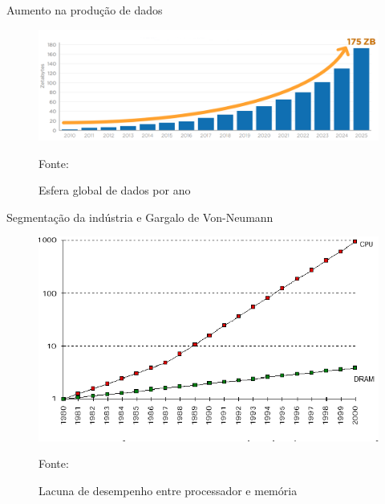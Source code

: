 \begin{frame}{Aumento na produção de dados}
	\begin{figure}[h!]
        \centering
        \includegraphics[width=\columnwidth]{images/relatorio-idc.png}
        
        \caption{Esfera global de dados por ano}
        \footnotesize{Fonte: \cite{relatorio-idc}}
    \end{figure} 
\end{frame}

\begin{frame}{Segmentação da indústria e Gargalo de Von-Neumann}
	\begin{figure}[h!]
        \centering
        \includegraphics[scale=0.42]{images/gap-processor-memory.png}
        
        \caption{Lacuna de desempenho entre processador e memória}
        \footnotesize{Fonte: \cite{fig-gap-processor-memory}}
    \end{figure} 
\end{frame}


